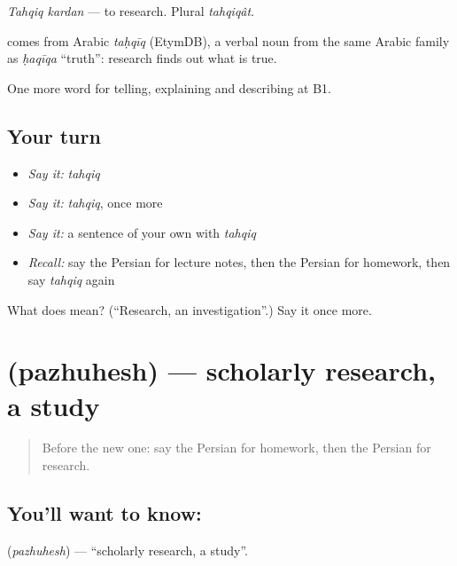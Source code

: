 \emph{Tahqiq kardan} — to research. Plural \emph{tahqiqât}.

\begin{cousinweb}
\textbf{} comes from Arabic \emph{taḥqīq} (EtymDB), a verbal noun from the same Arabic family as \emph{ḥaqīqa} \textquotedblleft{}truth\textquotedblright{}: research finds out what is true.
\end{cousinweb}

\begin{grammarlens}[title={What you've built}]
One more word for telling, explaining and describing at B1.
\end{grammarlens}

\subsection*{Your turn}
\begin{itemize}
\raggedright
  \item \emph{Say it:} \emph{tahqiq}
  \item \emph{Say it:} \emph{tahqiq}, once more
  \item \emph{Say it:} a sentence of your own with \emph{tahqiq}
  \item \emph{Recall:} say the Persian for lecture notes, then the Persian for homework, then say \emph{tahqiq} again
\end{itemize}

\begin{tcolorbox}[breakable,colback=teal!4,colframe=teal!35!black,title={Before you move on}]
What does  mean? (\textquotedblleft{}Research, an investigation\textquotedblright{}.) Say it once more.
\end{tcolorbox}
\section[\texorpdfstring{\fa{پژوهش} (pazhuhesh)}{پژوهش (pazhuhesh)}]{ (pazhuhesh) — scholarly research, a study}

\label{lesson:FA-C402-pazhuhesh}



\begin{quote}
Before the new one: say the Persian for homework, then the Persian for research.
\end{quote}

\subsection*{You'll want to know: }
\textbf{} (\emph{pazhuhesh}) — \textquotedblleft{}scholarly research, a study\textquotedblright{}.

